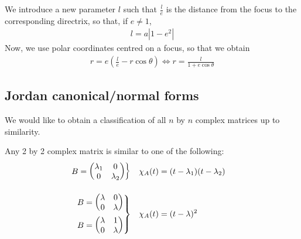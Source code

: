 \documentclass{../../template/note}
\begin{document}
    We introduce a new parameter \(l\) such that \(\frac l e\) is the distance from the focus to the corresponding directrix, so that, if \(e \neq 1\),
    \begin{align*}
        l = a|1-e^2|
    \end{align*}
    Now, we use polar coordinates centred on a focus, so that we obtain
    \begin{align*}
        r = e\left(\frac l e -r\cos \theta\right) \iff r = \frac l{1+e \cos \theta}
    \end{align*}
    
    \subsection{Jordan canonical/normal forms}

    We would like to obtain a classification of all \(n\) by \(n\) complex matrices up to similarity.   

    \begin{proposition}
        Any 2 by 2 complex matrix is similar to one of the following:
        \begin{align*}
            \begin{rcases}
                B = \begin{pmatrix}
                    \lambda_1 & 0 \\
                    0 & \lambda_2 \\
                \end{pmatrix}
            \end{rcases} && \chi_A(t) &= (t-\lambda_1)(t-\lambda_2) \\[10pt]
            \begin{rcases}
                B = \begin{pmatrix}
                    \lambda & 0 \\
                    0 & \lambda \\
                \end{pmatrix} \\
                B = \begin{pmatrix}
                    \lambda & 1 \\
                    0 & \lambda \\
                \end{pmatrix}
            \end{rcases} && \chi_A(t) &= (t-\lambda)^2
        \end{align*}
    \end{proposition}
    
\end{document}
